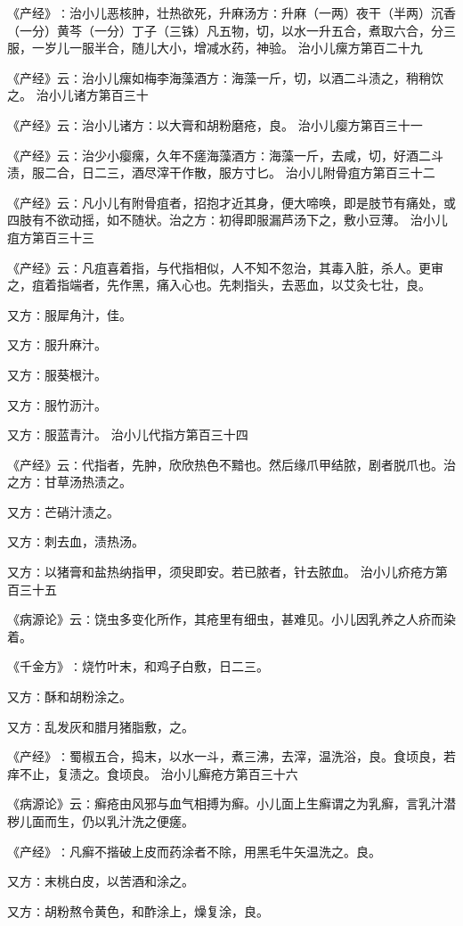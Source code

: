 \documentclass[a4paper,12pt,UTF8,twoside]{ctexbook}
\begin{document}
《产经》∶治小儿恶核肿，壮热欲死，升麻汤方∶升麻（一两）夜干（半两）沉香（一分）黄芩（一分）丁子（三铢）凡五物，切，以水一升五合，煮取六合，分三服，一岁儿一服半合，随儿大小，增减水药，神验。
治小儿瘰方第百二十九

《产经》云∶治小儿瘰如梅李海藻酒方∶海藻一斤，切，以酒二斗渍之，稍稍饮之。
治小儿诸方第百三十

《产经》云∶治小儿诸方∶以大膏和胡粉磨疮，良。
治小儿瘿方第百三十一

《产经》云∶治少小瘿瘰，久年不瘥海藻酒方∶海藻一斤，去咸，切，好酒二斗渍，服二合，日二三，酒尽滓干作散，服方寸匕。
治小儿附骨疽方第百三十二

《产经》云∶凡小儿有附骨疽者，招抱才近其身，便大啼唤，即是肢节有痛处，或四肢有不欲动摇，如不随状。治之方∶初得即服漏芦汤下之，敷小豆薄。
治小儿疽方第百三十三

《产经》云∶凡疽喜着指，与代指相似，人不知不忽治，其毒入脏，杀人。更审之，疽着指端者，先作黑，痛入心也。先刺指头，去恶血，以艾灸七壮，良。

又方∶服犀角汁，佳。

又方∶服升麻汁。

又方∶服葵根汁。

又方∶服竹沥汁。

又方∶服蓝青汁。
治小儿代指方第百三十四

《产经》云∶代指者，先肿，欣欣热色不黯也。然后缘爪甲结脓，剧者脱爪也。治之方∶甘草汤热渍之。

又方∶芒硝汁渍之。

又方∶刺去血，渍热汤。

又方∶以猪膏和盐热纳指甲，须臾即安。若已脓者，针去脓血。
治小儿疥疮方第百三十五

《病源论》云∶饶虫多变化所作，其疮里有细虫，甚难见。小儿因乳养之人疥而染着。

《千金方》∶烧竹叶末，和鸡子白敷，日二三。

又方∶酥和胡粉涂之。

又方∶乱发灰和腊月猪脂敷，之。

《产经》∶蜀椒五合，捣末，以水一斗，煮三沸，去滓，温洗浴，良。食顷良，若痒不止，复渍之。食顷良。
治小儿癣疮方第百三十六

《病源论》云∶癣疮由风邪与血气相搏为癣。小儿面上生癣谓之为乳癣，言乳汁潜秽儿面而生，仍以乳汁洗之便瘥。

《产经》∶凡癣不揩破上皮而药涂者不除，用黑毛牛矢温洗之。良。

又方∶末桃白皮，以苦酒和涂之。

又方∶胡粉熬令黄色，和酢涂上，燥复涂，良。
\end{document}
